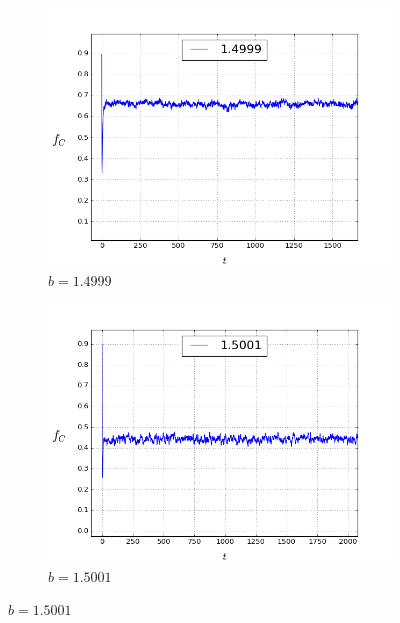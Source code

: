 \documentclass[a4paper]{article}
\begin{document}
	\begin{figure}[H]
		\centering
		\begin{subfigure}{.5\textwidth}
			\includegraphics[width=1\linewidth]{f1.4999.png}
			\caption{$b=1.4999$}
			\label{newf_left}
		\end{subfigure}%
		\begin{subfigure}{.5\textwidth}
			\includegraphics[width=1\linewidth]{f1.5001.png}
			\caption{$b=1.5001$}
			\label{newf_right}			
		\end{subfigure}%
	

\end{figure}
\end{document}
